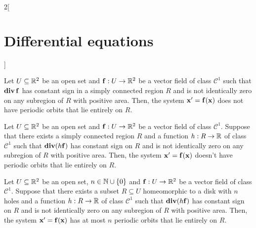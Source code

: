 \documentclass[../../../main.tex]{subfiles}
\begin{document}
\begin{multicols}{2}[\section{Differential equations}]
\begin{theorem}
    Let $U\subseteq \mathbb{R}^2$ be an open set and $\boldsymbol{\mathrm{f}}:U\rightarrow\mathbb{R}^2$ be a vector field of class $\mathcal{C}^1$ such that $\operatorname{\boldsymbol{\mathrm{div}}} \boldsymbol{\mathrm{f}}$ has constant sign in a simply connected region $R$ and is not identically zero on any subregion of $R$ with positive area. Then, the system $\boldsymbol{\mathrm{x}}'=\boldsymbol{\mathrm{f}}(\boldsymbol{\mathrm{x}})$ does not have periodic orbits that lie entirely on $R$.
  \end{theorem}
  \begin{theorem}
    Let $U\subseteq \mathbb{R}^2$ be an open set and $\boldsymbol{\mathrm{f}}:U\rightarrow\mathbb{R}^2$ be a vector field of class $\mathcal{C}^1$. Suppose that there exists a simply connected region $R$ and a function $h:R\rightarrow\mathbb{R}$ of class $\mathcal{C}^1$ such that $\operatorname{\boldsymbol{\mathrm{div}}} (h\boldsymbol{\mathrm{f}})$ has constant sign on $R$ and is not identically zero on any subregion of $R$ with positive area. Then, the system $\boldsymbol{\mathrm{x}}'=\boldsymbol{\mathrm{f}}(\boldsymbol{\mathrm{x}})$ doesn't have periodic orbits that lie entirely on $R$.
  \end{theorem}
  \begin{theorem}
    Let $U\subseteq \mathbb{R}^2$ be an open set, $n\in\mathbb{N}\cup\{0\}$ and $\boldsymbol{\mathrm{f}}:U\rightarrow\mathbb{R}^2$ be a vector field of class $\mathcal{C}^1$. Suppose that there exists a subset $R\subseteq U$ homeomorphic to a disk with $n$ holes and a function $h:R\rightarrow\mathbb{R}$ of class $\mathcal{C}^1$ such that $\operatorname{\boldsymbol{\mathrm{div}}} (h\boldsymbol{\mathrm{f}})$ has constant sign on $R$ and is not identically zero on any subregion of $R$ with positive area. Then, the system $\boldsymbol{\mathrm{x}}'=\boldsymbol{\mathrm{f}}(\boldsymbol{\mathrm{x}})$ has at most $n$ periodic orbits that lie entirely on $R$.
  \end{theorem}

\end{multicols}
\end{document}
